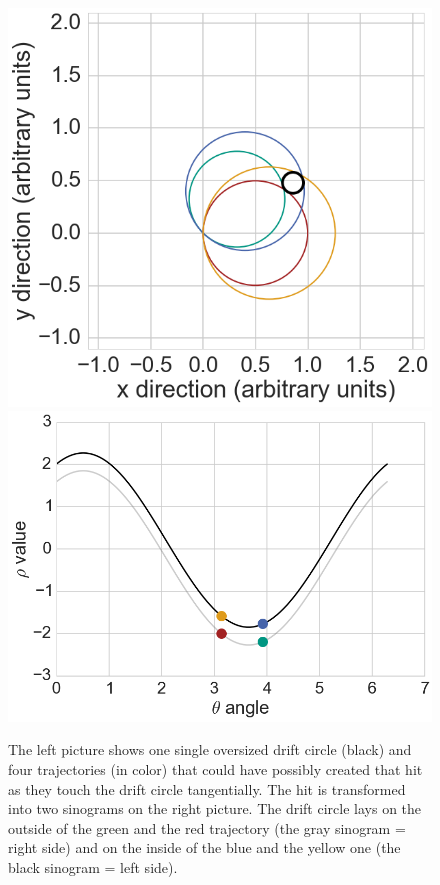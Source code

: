 \begin{figure}
  \centering
  \includegraphics[scale=0.27]{figures/theory/sinosodial_1.png}
  \hspace*{1cm}
  \includegraphics[scale=0.27]{figures/theory/sinosodial_2.png}
  \caption[Sinograms in the legendre algorithm.]{The left picture shows one single oversized drift circle (black) and four trajectories (in color) that could have possibly created that hit as they touch the drift circle tangentially. The hit is transformed into two sinograms on the right picture. The drift circle lays on the outside of the green and the red trajectory (the gray sinogram = right side) and on the inside of the blue and the yellow one (the black sinogram = left side).}
  \label{fig-sinosodial}
\end{figure}


